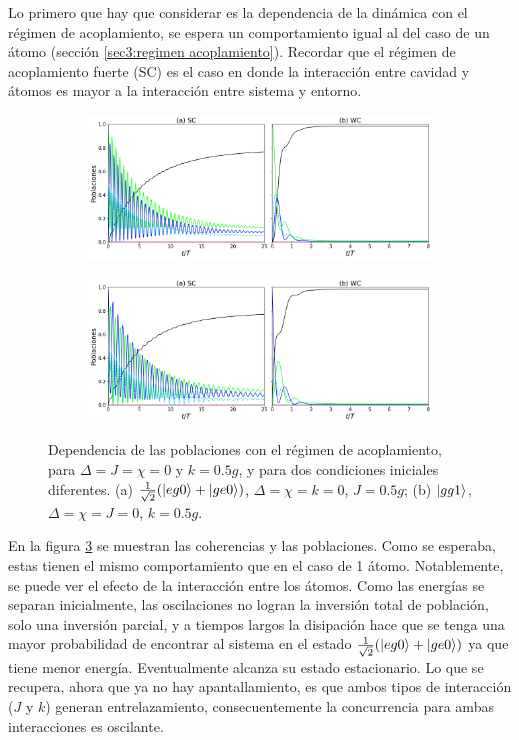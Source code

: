 Lo primero que hay que considerar es la dependencia de la dinámica con el régimen de acoplamiento, se espera un comportamiento igual al del caso de un átomo (sección \ref{sec3:regimen acoplamiento}). Recordar que el régimen de acoplamiento fuerte (SC) es el caso en donde la interacción entre cavidad y átomos es mayor a la interacción entre sistema y entorno.
\begin{figure}[h]
    \centering
    \begin{subfigure}{0.7\textwidth}
        \includegraphics[width=\textwidth]{figuras/ch4/sc vs wc eg0 sim j0.5.png}
        \caption{}
        \label{fig4:acoplamiento eg0 sim}
    \end{subfigure}
    \vfill
    \begin{subfigure}{0.7\textwidth}
        \includegraphics[width=\textwidth]{figuras/ch4/sc vs wc gg1 k=0.5.png}
        \caption{}
        \label{fig4:acoplamiento gg1}
    \end{subfigure}
    \caption{Dependencia de las poblaciones con el régimen de acoplamiento, para $\Delta=J=\chi=0$ y $k=0.5g$, y para dos condiciones iniciales diferentes. (a) $\frac{1}{\sqrt{2}}(\ket{eg0}+\ket{ge0})$, $\Delta=\chi=k=0$, $J=0.5g$; (b) $\ket{gg1}$, $\Delta=\chi=J=0$, $k=0.5g$.}
    \label{fig4:regimen acoplamiento}
\end{figure}
En  la figura \ref{fig4:regimen acoplamiento} se muestran las coherencias y las poblaciones. Como se esperaba, estas tienen el mismo comportamiento que en el caso de 1 átomo. Notablemente, se puede ver el efecto de la interacción entre los átomos. Como las energías se separan inicialmente, las oscilaciones no logran la inversión total de población, solo una inversión parcial, y a tiempos largos la disipación hace que se tenga una mayor probabilidad de encontrar al sistema en el estado $\frac{1}{\sqrt{2}}(\ket{eg0}+\ket{ge0})$ ya que tiene menor energía. Eventualmente alcanza su estado estacionario. Lo que se recupera, ahora que ya no hay apantallamiento, es que ambos tipos de interacción ($J$ y $k$) generan entrelazamiento, consecuentemente la concurrencia para ambas interacciones es oscilante. 

